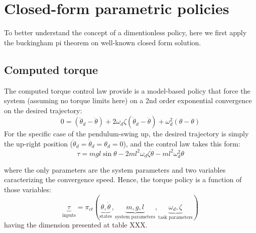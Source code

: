 \newpage
\section{Closed-form parametric policies}

To better understand the concept of a dimentionless policy, here we first apply the buckingham pi theorem on well-known closed form solution.

\subsection{Computed torque}

The computed torque control law provide is a model-based policy that force the system (assuming no torque limits here) on a 2nd order exponential convergence on the desired trajectory:
\begin{equation}
0 = (\ddot{\theta}_d - \ddot{\theta})+ 2 \omega_d \zeta (\dot{\theta}_d - \dot{\theta}) + \omega_d^2 (\theta - \theta)
\end{equation}
For the specific case of the pendulum-swing up, the desired trajectory is simply the up-right position ($\ddot{\theta}_d = \dot{\theta}_d = \theta_d = 0$), and the control law takes this form:
\begin{equation}
\tau = mgl \sin \theta - 2 m l^2 \omega_d \zeta \dot{\theta} - m l^2 \omega_d^2 \theta
\label{eq:ct}
\end{equation}

where the only parameters are the system parameters and two variables caracterizing the convergence speed. Hence, the torque policy is a function of those variables:
\begin{equation}
\underbrace{\tau}_{\text{inputs}}
=
\pi_{ct} \left(
\underbrace{ \theta, \dot{\theta} }_{\text{states}},
\underbrace{ m , g , l }_{\text{system parameters}},
\underbrace{ \omega_d , \zeta }_{\text{task parameters}}
\right)
\end{equation}
having the dimension presented at table XXX.

